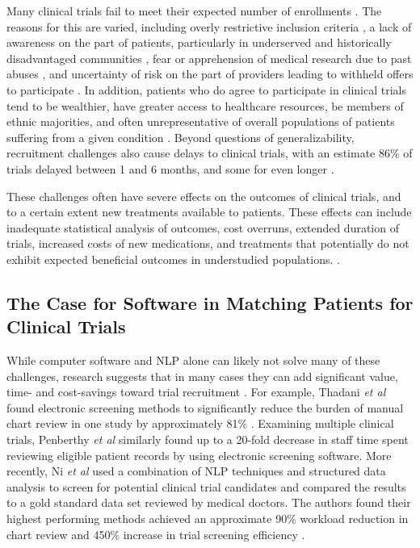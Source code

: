 \documentclass[../main.tex]{subfiles}
\begin{document}
Many clinical trials fail to meet their expected number of enrollments \cite{frank2004current, grill2010addressing, heller2014strategies, nipp2019overcoming}. The reasons for this are varied, including overly restrictive inclusion criteria \cite{grill2010addressing}, a lack of awareness on the part of patients, particularly in underserved and historically disadvantaged communities \cite{heller2014strategies}, fear or apprehension of medical research due to past abuses \cite{frank2004current}, and uncertainty of risk on the part of providers leading to withheld offers to participate \cite{nipp2019overcoming}. In addition, patients who do agree to participate in clinical trials tend to be wealthier, have greater access to healthcare resources, be members of ethnic majorities, and often unrepresentative of overall populations of patients suffering from a given condition \cite{grill2010addressing, heller2014strategies, nipp2019overcoming, guadagnolo2009involving, penberthy2010automated, holmes2012increasing}. Beyond questions of generalizability, recruitment challenges also cause delays to clinical trials, with an estimate 86\% of trials delayed between 1 and 6 months, and some for even longer \cite{sullivan2004subject, thadani2009electronic}.

These challenges often have severe effects on the outcomes of clinical trials, and to a certain extent new treatments available to patients. These effects can include inadequate statistical analysis of outcomes, cost overruns, extended duration of trials, increased costs of new medications, and treatments that potentially do not exhibit expected beneficial outcomes in understudied populations. \cite{easterbrook1992fate, penberthy2010automated, mcdonald2006influences, marks2002using}.

\subsection{The Case for Software in Matching Patients for Clinical Trials}

While computer software and NLP alone can likely not solve many of these challenges, research suggests that in many cases they can add significant value, time- and cost-savings toward trial recruitment \cite{penberthy2010automated, thadani2009electronic}. For example, Thadani \textit{et al} found electronic screening methods to significantly reduce the burden of manual chart review in one study by approximately 81\% \cite{thadani2009electronic}. Examining multiple clinical trials, Penberthy \textit{et al} similarly found up to a 20-fold decrease in staff time spent reviewing eligible patient records by using electronic screening software. More recently, Ni \textit{et al} used a combination of NLP techniques and structured data analysis to screen for potential clinical trial candidates and compared the results to a gold standard data set reviewed by medical doctors. The authors found their highest performing methods achieved an approximate 90\% workload reduction in chart review and 450\% increase in trial screening efficiency \cite{ni2015automated}. 
\end{document}

